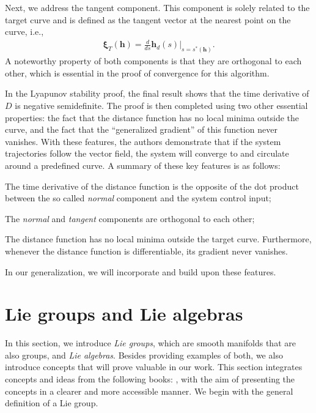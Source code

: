 Next, we address the tangent component. This component is solely related to the target curve and is defined as the tangent vector at the nearest point on the curve, i.e.,
\begin{align}
    \boldsymbol{\xi}_{T}(\mathbf{h}) = \frac{d}{ds}\mathbf{h}_d(s)|_{s=s^*(\mathbf{h})}.
\end{align}
A noteworthy property of both components is that they are orthogonal to each other, which is essential in the proof of convergence for this algorithm.

In the Lyapunov stability proof, the final result shows that the time derivative of $D$ is negative semidefinite. The proof is then completed using two other essential properties: the fact that the distance function has no local minima outside the curve, and the fact that the ``generalized gradient'' of this function never vanishes. With these features, the authors demonstrate that if the system trajectories follow the vector field, the system will converge to and circulate around a predefined curve. A summary of these key features is as follows:
\begin{feature}
    \item The time derivative of the distance function is the opposite of the dot product between the so called \emph{normal} component and the system control input; \label{feat:adriano-time-derivative-lyapunov-normal-comp}
    \item The \emph{normal} and \emph{tangent} components are orthogonal to each other; \label{feat:adriano-orthogonality}
    \item The distance function has no local minima outside the target curve. Furthermore, whenever the distance function is differentiable, its gradient never vanishes. \label{feat:adriano-no-local-minima}
\end{feature}
In our generalization, we will incorporate and build upon these features.

\section{Lie groups and Lie algebras}\label{sec:background-lie-theory}
In this section, we introduce \emph{Lie groups}, which are smooth manifolds that are also groups, and \emph{Lie algebras}. Besides providing examples of both, we also introduce concepts that will prove valuable in our work. This section integrates concepts and ideas from the following books: \citet{Lee2012,Gallier2020,Hall2015,Duistermaat2012}, with the aim of presenting the concepts in a clearer and more accessible manner. We begin with the general definition of a Lie group.
